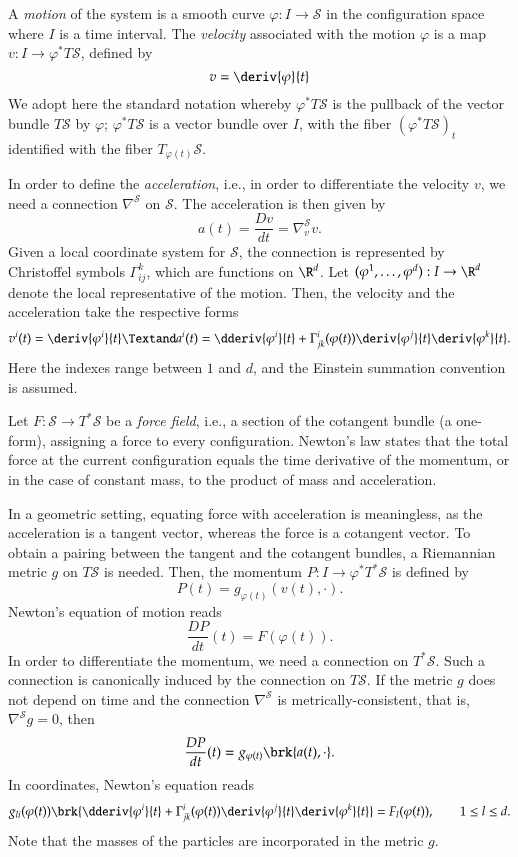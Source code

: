 \documentclass[smallextended]{svjour3}
\begin{document}
A \emph{motion} of the system is a smooth curve ${\varphi}:I  \to {\mathcal{S}}$
in the configuration space where $I$ is a time interval.
The \emph{velocity} associated with the motion ${\varphi}$ is a map $v:I\to {\varphi}^*T{\mathcal{S}}$, defined by 
\[
v=\deriv{\varphi}{t}
\] 
We adopt here the standard notation whereby ${\varphi}^* T{\mathcal{S}}$ is the pullback of the vector bundle $T{\mathcal{S}}$ by ${\varphi}$; 
${\varphi}^* T{\mathcal{S}}$ is a vector bundle over $I$, with the fiber $({\varphi}^*T{\mathcal{S}})_t$ identified with the fiber $T_{{\varphi}(t)}{\mathcal{S}}$.

In order to define the \emph{acceleration}, i.e., in order to differentiate the velocity $v$, we need a connection $\nabla^{\mathcal{S}}$ on ${\mathcal{S}}$. The acceleration is then given by
\[
a(t)=\frac{Dv}{dt}=\nabla^{\mathcal{S}}_vv.
\]
Given a local coordinate system for ${\mathcal{S}}$,  the connection is represented by Christoffel symbols $\Gamma_{ij}^k$, which are functions on $\R^d$. Let $({\varphi}^1,\dots,{\varphi}^d): I\to\R^d$ denote the local representative of the motion. Then, the velocity and the acceleration take the respective forms
\[
v^i(t)=\deriv{{\varphi}^i}{t}
\Textand
a^i(t)=\dderiv{{\varphi}^i}{t}+\Gamma^i_{jk}({\varphi}(t))\deriv{{\varphi}^j}{t}\deriv{{\varphi}^k}{t}.
\]
Here the indexes range between $1$ and $d$, and the Einstein summation convention is assumed. 

Let $F:{\mathcal{S}}\to T^*{\mathcal{S}}$ be a \emph{force field}, i.e., a section of the cotangent bundle (a one-form), assigning a force to every configuration. Newton's law states that the total force at the current configuration equals the time derivative of the momentum, or in the case of constant mass, to the product of mass and acceleration. 

In a geometric setting, equating force with acceleration is meaningless, as the acceleration is a tangent vector, whereas the force is a cotangent vector.
To obtain a pairing between the tangent and the cotangent bundles, a Riemannian metric $g$ on $T{\mathcal{S}}$ is needed. 
Then, the momentum $P:I\to {\varphi}^*T^*{\mathcal{S}}$ is defined by
\[
P(t) = g_{{\varphi}(t)}(v(t),\cdot).
\]
Newton's equation of motion reads
\[
\frac{DP}{dt}(t)=F({\varphi}(t)).
\]   
In order to differentiate the momentum, we need a connection on $T^*{\mathcal{S}}$. Such a connection is canonically induced by the connection on $T{\mathcal{S}}$. If the metric $g$ does not depend on time and the connection $\nabla^{\mathcal{S}}$ is metrically-consistent, that is, $\nabla^{\mathcal{S}} g=0$, then
\[
\frac{DP}{dt}(t) = g_{{\varphi}(t)}\brk{a(t),\cdot}.
\]
In coordinates, Newton's equation  reads
\[
g_{li}({\varphi}(t))\brk{\dderiv{{\varphi}^i}{t}+\Gamma^i_{jk}({\varphi}(t))\deriv{{\varphi}^j}{t}\deriv{{\varphi}^k}{t}}=F_l({\varphi}(t)), \qquad 1\leq l\leq d.
\]
Note that the masses of the particles are incorporated in the metric $g$. 
\end{document}
